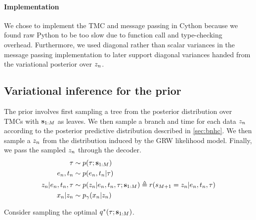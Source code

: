 \paragraph{Implementation} We chose
to implement the TMC and message
passing in Cython because we found raw Python to be
too slow due to function call and type-checking
overhead. Furthermore, we used diagonal rather than
scalar variances in the message passing implementation
to later support diagonal variances handed 
from the variational posterior over $z_n$.

\subsection{Variational inference for the \acronym\;prior}
\label{sec:inference-details}

The \acronym\; prior involves first sampling a tree
from the posterior distribution over TMCs
with $\mathbf{s}_{1:M}$ as leaves.
We then sample a branch and time
for each data $z_n$ according
to the posterior predictive
distribution described in \autoref{sec:bnhc}.
We then sample a $z_n$ from
the distribution induced by the GRW likelihood model.
Finally, we pass the sampled $z_n$
through the decoder.
\begin{equation}
    \begin{split}
        \tau &\sim p(\tau ; \mathbf{s}_{1:M}) \\
        e_n, t_n &\sim p(e_n, t_n | \tau) \\
        z_n | e_n, t_n, \tau &\sim p(z_n | e_n, t_n, \tau; \mathbf{s}_{1:M}) \triangleq r(s_{M + 1} = z_n | e_n, t_n, \tau) \\
        x_n | z_n &\sim p_\gamma(x_n | z_n)
    \end{split}
\end{equation}

Consider sampling the optimal $q^*(\tau; \mathbf{s}_{1:M})$.

